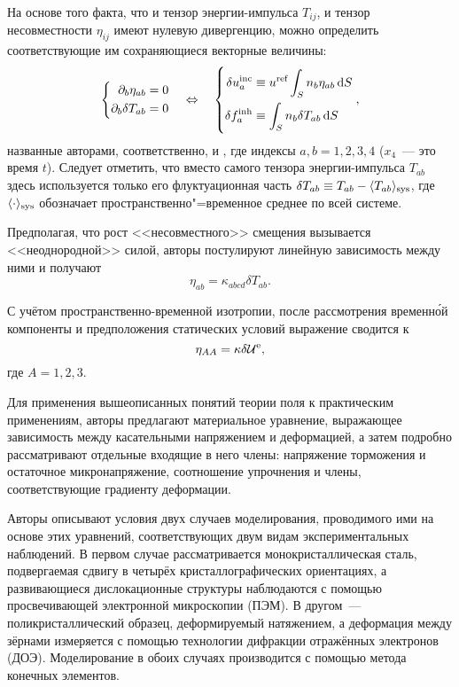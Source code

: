 \documentclass[a4paper, 14pt, titlepage]{extarticle}
\newcommand{\elast}{\textup{e}}%
\newcommand{\inc}{\textup{inc}}  %
\newcommand{\inh}{\textup{inh}}  %
\newcommand{\refer}{\textup{ref}}%
\newcommand{\sys}{\textup{sys}}  %
\begin{document}
  На основе того факта, что и тензор энергии-импульса $T_{ij}$, и тензор несовместности $\eta_{ij}$
  имеют нулевую дивергенцию, можно определить соответствующие им сохраняющиеся векторные величины:
  \[
    \left\{
      \begin{aligned}[c]
        \partial_b \eta_{ab} &= 0\\
        \partial_b \delta T_{ab} &= 0
      \end{aligned}
    \right.
    \quad \Leftrightarrow \quad
    \left\{
      \begin{aligned}[c]
        \delta u^\inc_a &\equiv u^\refer \int_S n_b \eta_{ab} \dif S \\
        \delta f^\inh_a &\equiv \int_S n_b \delta T_{ab} \dif S
      \end{aligned}
    \right. ,
  \]
  названные авторами, соответственно,  и , где индексы $a,b = 1,2,3,4$ ($x_4$~--- это время $t$). Следует отметить, что вместо самого
  тензора энергии-импульса $T_{ab}$ здесь используется только его флуктуационная часть
  $\delta T_{ab} \equiv T_{ab} - \langle T_{ab} \rangle_\sys$, где $\langle \cdot \rangle_\sys$
  обозначает пространственно"=временное среднее по всей системе.

  Предполагая, что рост <<несовместного>> смещения вызывается <<неоднородной>> силой, авторы
  постулируют линейную зависимость между ними и получают
  \[
    \eta_{ab} = \kappa_{abcd} \delta T_{ab}.
  \]

  С учётом пространственно-временной изотропии, после рассмотрения временн\'{о}й компоненты и
  предположения статических условий выражение сводится к
  \[
    \eta_{AA} = \kappa \delta \mathcal{U}^\elast,
  \]
  где $A = 1,2,3$.

  Для применения вышеописанных понятий теории поля к практическим применениям, авторы предлагают
  материальное уравнение, выражающее зависимость между касательными
  напряжением и деформацией, а затем подробно рассматривают отдельные входящие в него члены:
  напряжение торможения и остаточное микронапряжение, соотношение упрочнения и члены, соответствующие
  градиенту деформации.

  Авторы описывают условия двух случаев моделирования, проводимого ими на основе этих уравнений,
  соответствующих двум видам экспериментальных наблюдений.
  В первом случае рассматривается монокристаллическая сталь, подвергаемая сдвигу в четырёх
  кристаллографических ориентациях, а развивающиеся дислокационные структуры наблюдаются с помощью
  просвечивающей электронной микроскопии (ПЭМ). В другом~--- поликристаллический образец, деформируемый
  натяжением, а деформация между зёрнами измеряется с помощью технологии дифракции отражённых электронов (ДОЭ).
  Моделирование в обоих случаях производится с помощью метода конечных элементов.
\end{document}
